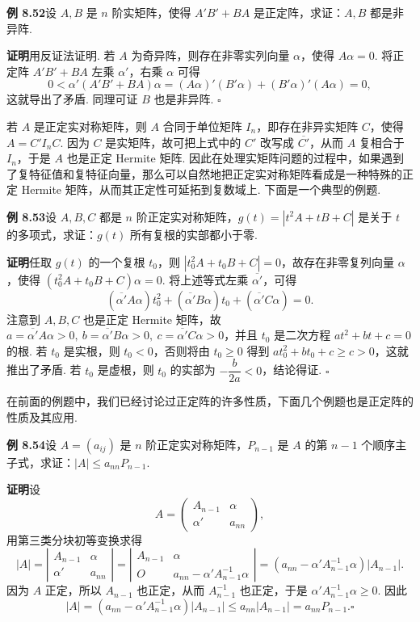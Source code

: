 \documentclass[UTF8,12pt,a4paper,fontset=fandol]{ctexart}
\begin{document}
\noindent\textbf{例 8.52}\quad 设 $A,B$ 是 $n$ 阶实矩阵，使得 $A'B'+BA$ 是正定阵，求证：$A,B$ 都是非异阵.

\noindent\textbf{证明}\quad 用反证法证明. 若 $A$ 为奇异阵，则存在非零实列向量 $\alpha$，使得 $A\alpha=0$. 将正定阵 $A'B'+BA$ 左乘 $\alpha'$，右乘 $\alpha$ 可得
\[
0<\alpha'(A'B'+BA)\alpha=(A\alpha)'(B'\alpha)+(B'\alpha)'(A\alpha)=0,
\]
这就导出了矛盾. 同理可证 $B$ 也是非异阵. $\ensuremath{\square}$

若 $A$ 是正定实对称矩阵，则 $A$ 合同于单位矩阵 $I_n$，即存在非异实矩阵 $C$，使得 $A=C'I_nC$. 因为 $C$ 是实矩阵，故可把上式中的 $C'$ 改写成 $\overline{C'}$，从而 $A$ 复相合于 $I_n$，于是 $A$ 也是正定 Hermite 矩阵. 因此在处理实矩阵问题的过程中，如果遇到了复特征值和复特征向量，那么可以自然地把正定实对称矩阵看成是一种特殊的正定 Hermite 矩阵，从而其正定性可延拓到复数域上. 下面是一个典型的例题.

\noindent\textbf{例 8.53}\quad 设 $A,B,C$ 都是 $n$ 阶正定实对称矩阵，$g(t)=|t^2A+tB+C|$ 是关于 $t$ 的多项式，求证：$g(t)$ 所有复根的实部都小于零.

\noindent\textbf{证明}\quad 任取 $g(t)$ 的一个复根 $t_0$，则 $|t_0^2A+t_0B+C|=0$，故存在非零复列向量 $\alpha$，使得 $(t_0^2A+t_0B+C)\alpha=0$. 将上述等式左乘 $\overline{\alpha'}$，可得
\[
(\overline{\alpha'}A\alpha)t_0^2+(\overline{\alpha'}B\alpha)t_0+(\overline{\alpha'}C\alpha)=0.
\]
注意到 $A,B,C$ 也是正定 Hermite 矩阵，故 $a=\overline{\alpha'}A\alpha>0,\ b=\overline{\alpha'}B\alpha>0,\ c=\overline{\alpha'}C\alpha>0$，并且 $t_0$ 是二次方程 $at^2+bt+c=0$ 的根. 若 $t_0$ 是实根，则 $t_0<0$，否则将由 $t_0\ge 0$ 得到 $at_0^2+bt_0+c\ge c>0$，这就推出了矛盾. 若 $t_0$ 是虚根，则 $t_0$ 的实部为 $-\dfrac{b}{2a}<0$，结论得证. $\ensuremath{\square}$

在前面的例题中，我们已经讨论过正定阵的许多性质，下面几个例题也是正定阵的性质及其应用.

\noindent\textbf{例 8.54}\quad 设 $A=(a_{ij})$ 是 $n$ 阶正定实对称矩阵，$P_{n-1}$ 是 $A$ 的第 $n-1$ 个顺序主子式，求证：$|A|\le a_{nn}P_{n-1}$.

\noindent\textbf{证明}\quad 设
\[
A=\left(\begin{array}{cc}
A_{n-1} & \alpha\\
\alpha' & a_{nn}
\end{array}\right),
\]
用第三类分块初等变换求得
\[
|A|=
\left|\begin{array}{cc}
A_{n-1} & \alpha\\
\alpha' & a_{nn}
\end{array}\right|
=
\left|\begin{array}{cc}
A_{n-1} & \alpha\\
O & a_{nn}-\alpha'A_{n-1}^{-1}\alpha
\end{array}\right|
=(a_{nn}-\alpha'A_{n-1}^{-1}\alpha)|A_{n-1}|.
\]
因为 $A$ 正定，所以 $A_{n-1}$ 也正定，从而 $A_{n-1}^{-1}$ 也正定，于是 $\alpha'A_{n-1}^{-1}\alpha\ge 0$. 因此
\[
|A|=(a_{nn}-\alpha'A_{n-1}^{-1}\alpha)|A_{n-1}|\le a_{nn}|A_{n-1}|=a_{nn}P_{n-1}. \ensuremath{\square}
\]
\end{document}
